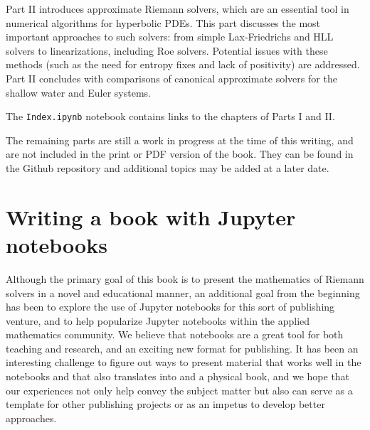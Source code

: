 \documentclass{SIAMbook2016}
\begin{document}
Part II introduces approximate Riemann solvers, which are an essential
tool in numerical algorithms for hyperbolic PDEs. This part discusses
the most important approaches to such solvers: from simple
Lax-Friedrichs and HLL solvers to linearizations, including Roe solvers.
Potential issues with these methods (such as the need for entropy fixes
and lack of positivity) are addressed. Part II concludes with
comparisons of canonical approximate solvers for the shallow water and
Euler systems.

The {\tt Index.ipynb} notebook contains links to the chapters of
Parts I and II.

The remaining parts are still a work in progress at the time of this
writing, and are not included in the print or PDF version of the book.
They can be found in the Github repository and additional topics may be
added at a later date.

\hypertarget{writing-a-book-with-jupyter-notebooks}{%
\section*{Writing a book with Jupyter
notebooks}\label{writing-a-book-with-jupyter-notebooks}}

Although the primary goal of this book is to present the mathematics of
Riemann solvers in a novel and educational manner, an additional goal
from the beginning has been to explore the use of Jupyter notebooks for
this sort of publishing venture, and to help popularize Jupyter
notebooks within the applied mathematics community. We believe that
notebooks are a great tool for both teaching and research, and an
exciting new format for publishing. It has been an interesting challenge
to figure out ways to present material that works well in the notebooks
and that also translates into
and a physical book, and we hope that our experiences not only help
convey the subject matter but also can serve as a template for other
publishing projects or as an impetus to develop better approaches.
\end{document}
